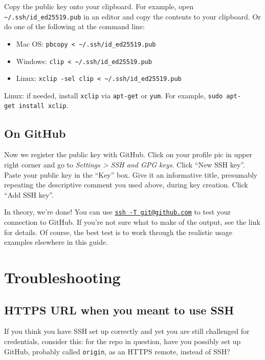 \documentclass[
]{book}
\providecommand{\tightlist}{%
  \setlength{\itemsep}{0pt}\setlength{\parskip}{0pt}}
\begin{document}
Copy the public key onto your clipboard.
For example, open \texttt{\textasciitilde{}/.ssh/id\_ed25519.pub} in an editor and copy the contents to your clipboard.
Or do one of the following at the command line:

\begin{itemize}
\tightlist
\item
  Mac OS: \texttt{pbcopy\ \textless{}\ \textasciitilde{}/.ssh/id\_ed25519.pub}
\item
  Windows: \texttt{clip\ \textless{}\ \textasciitilde{}/.ssh/id\_ed25519.pub}
\item
  Linux: \texttt{xclip\ -sel\ clip\ \textless{}\ \textasciitilde{}/.ssh/id\_ed25519.pub}
\end{itemize}

Linux: if needed, install \texttt{xclip} via \texttt{apt-get} or \texttt{yum}. For example, \texttt{sudo\ apt-get\ install\ xclip}.

\subsection{On GitHub}\label{on-github}

Now we register the public key with GitHub.
Click on your profile pic in upper right corner and go to \emph{Settings \textgreater{} SSH and GPG keys}.
Click ``New SSH key''.
Paste your public key in the ``Key'' box.
Give it an informative title, presumably repeating the descriptive comment you used above, during key creation.
Click ``Add SSH key''.

In theory, we're done!
You can use \href{https://docs.github.com/en/authentication/connecting-to-github-with-ssh/testing-your-ssh-connection}{\texttt{ssh\ -T\ git@github.com}} to test your connection to GitHub.
If you're not sure what to make of the output, see the link for details.
Of course, the best test is to work through the realistic usage examples elsewhere in this guide.

\section{Troubleshooting}\label{ssh-troubleshooting}

\subsection{HTTPS URL when you meant to use SSH}\label{https-url-when-you-meant-to-use-ssh}

If you think you have SSH set up correctly and yet you are still challenged for credentials, consider this: for the repo in question, have you possibly set up GitHub, probably called \texttt{origin}, as an HTTPS remote, instead of SSH?
\end{document}

